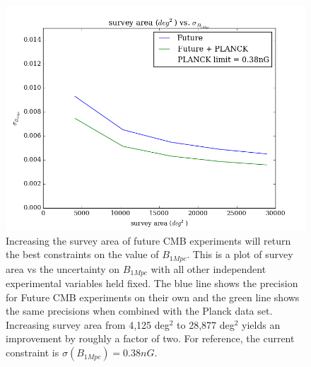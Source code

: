 \begin{figure}[h]
\centering
\includegraphics[scale=0.7]{images/area.png}
\caption{Increasing the survey area of future CMB experiments will return the best constraints on the value of $B_{1Mpc}$. This is a plot of survey area vs the uncertainty on $B_{1Mpc}$ with all other independent experimental variables held fixed. The blue line shows the precision for Future CMB experiments on their own and the green line shows the same precisions when combined with the Planck data set. Increasing survey area from 4,125 deg$^2$ to 28,877 deg$^2$ yields an improvement by roughly a factor of two. For reference, the current constraint is $\sigma(B_{1Mpc}) = 0.38nG$.}
\label{fig:area}
\end{figure}

